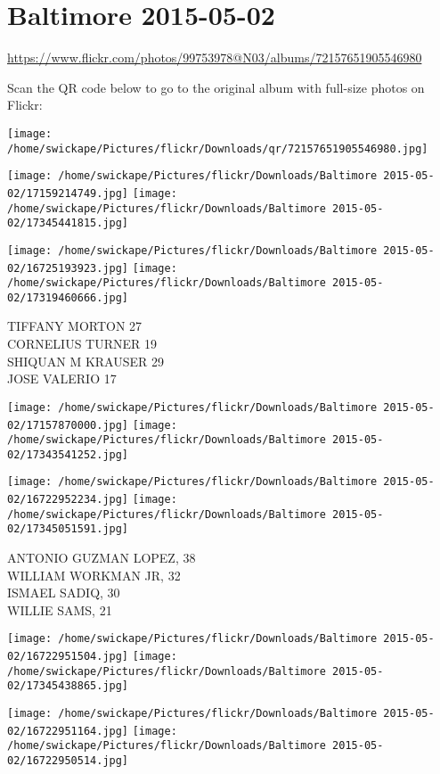 \documentclass[10pt,letterpaper]{article}
\title{}
\author{}
\date{}
\begin{document}
\section*{Baltimore 2015-05-02}

\url{https://www.flickr.com/photos/99753978@N03/albums/72157651905546980}

Scan the QR code below to go to the original album with full-size photos on Flickr:

\texttt{[image: /home/swickape/Pictures/flickr/Downloads/qr/72157651905546980.jpg]}
\pagebreak

\texttt{[image: /home/swickape/Pictures/flickr/Downloads/Baltimore 2015-05-02/17159214749.jpg]}
\texttt{[image: /home/swickape/Pictures/flickr/Downloads/Baltimore 2015-05-02/17345441815.jpg]}

\texttt{[image: /home/swickape/Pictures/flickr/Downloads/Baltimore 2015-05-02/16725193923.jpg]}
\texttt{[image: /home/swickape/Pictures/flickr/Downloads/Baltimore 2015-05-02/17319460666.jpg]}

TIFFANY MORTON 27\\
CORNELIUS TURNER 19\\
SHIQUAN M KRAUSER 29\\
JOSE VALERIO 17
\pagebreak

\texttt{[image: /home/swickape/Pictures/flickr/Downloads/Baltimore 2015-05-02/17157870000.jpg]}
\texttt{[image: /home/swickape/Pictures/flickr/Downloads/Baltimore 2015-05-02/17343541252.jpg]}

\texttt{[image: /home/swickape/Pictures/flickr/Downloads/Baltimore 2015-05-02/16722952234.jpg]}
\texttt{[image: /home/swickape/Pictures/flickr/Downloads/Baltimore 2015-05-02/17345051591.jpg]}

ANTONIO GUZMAN LOPEZ, 38\\
WILLIAM WORKMAN JR, 32\\
ISMAEL SADIQ, 30\\
WILLIE SAMS, 21
\pagebreak

\texttt{[image: /home/swickape/Pictures/flickr/Downloads/Baltimore 2015-05-02/16722951504.jpg]}
\texttt{[image: /home/swickape/Pictures/flickr/Downloads/Baltimore 2015-05-02/17345438865.jpg]}

\texttt{[image: /home/swickape/Pictures/flickr/Downloads/Baltimore 2015-05-02/16722951164.jpg]}
\texttt{[image: /home/swickape/Pictures/flickr/Downloads/Baltimore 2015-05-02/16722950514.jpg]}
\end{document}
